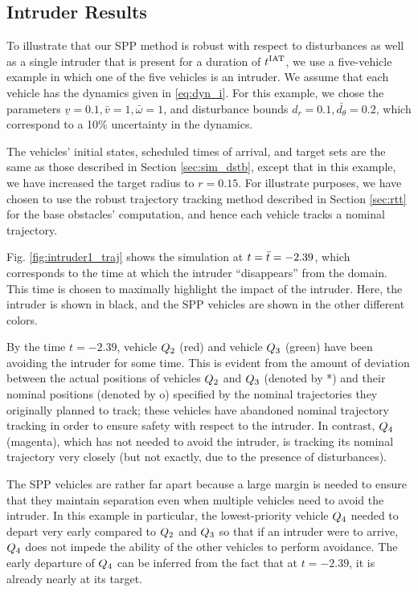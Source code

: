\subsection{Intruder Results \label{sec:intruder_results}}
To illustrate that our SPP method is robust with respect to disturbances as well as a single intruder that is present for a duration of $t^\text{IAT}$, we use a five-vehicle example in which one of the five vehicles is an intruder. We assume that each vehicle has the dynamics given in \eqref{eq:dyn_i}. For this example, we chose the parameters $\underline{v} = 0.1, \bar{v} = 1, \bar\omega = 1$, and disturbance bounds $d_{r} = 0.1, \bar{d_{\theta}} = 0.2$, which correspond to a 10\% uncertainty in the dynamics. 

The vehicles' initial states, scheduled times of arrival, and target sets are the same as those described in Section \ref{sec:sim_dstb}, except that in this example, we have increased the target radius to $r=0.15$. For illustrate purposes, we have chosen to use the robust trajectory tracking method described in Section \ref{sec:rtt} for the base obstacles' computation, and hence each vehicle tracks a nominal trajectory.

Fig. \ref{fig:intruder1_traj} shows the simulation at $t = \bar{t} = -2.39$, which corresponds to the time at which the intruder ``disappears'' from the domain. This time is chosen to maximally highlight the impact of the intruder. Here, the intruder is shown in black, and the SPP vehicles are shown in the other different colors.

By the time $t = -2.39$, vehicle $Q_2$ (red) and vehicle $Q_3$ (green) have been avoiding the intruder for some time. This is evident from the amount of deviation between the actual positions of vehicles $Q_2$ and $Q_3$ (denoted by *) and their nominal positions (denoted by o) specified by the nominal trajectories they originally planned to track; these vehicles have abandoned nominal trajectory tracking in order to ensure safety with respect to the intruder. In contrast, $Q_4$ (magenta), which has not needed to avoid the intruder, is tracking its nominal trajectory very closely (but not exactly, due to the presence of disturbances).

The SPP vehicles are rather far apart because a large margin is needed to ensure that they maintain separation even when multiple vehicles need to avoid the intruder. In this example in particular, the lowest-priority vehicle $Q_4$ needed to depart very early compared to $Q_2$ and $Q_3$ so that if an intruder were to arrive, $Q_4$ does not impede the ability of the other vehicles to perform avoidance. The early departure of $Q_4$ can be inferred from the fact that at $t=-2.39$, it is already nearly at its target.


